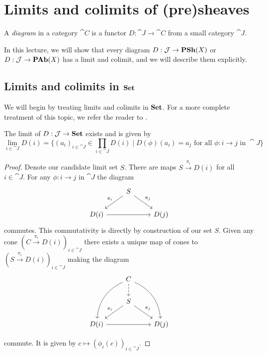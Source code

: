 \documentclass[../main.tex]{subfiles}
\begin{document}
\chapter{Limits and colimits of (pre)sheaves}
\begin{defn}
    A \emph{diagram} in a category $\cat C$ is a functor $D: \cat J \to \cat C$ from a small category $\cat J$. 
\end{defn}

In this lecture, we will show that every diagram $D: \mathcal{J} \to \operatorname{\mathbf{PSh}}(X)$ or $D: \mathcal{J} \to \operatorname{\mathbf{PAb}}(X)$ has a limit and colimit, and we will describe them explicitly.

\section{Limits and colimits in $\mathbf{Set}$}

We will begin by treating limits and colimits in $\mathbf{Set}$. For a more complete treatment of this topic, we refer the reader to \cite[Chapter~3.2]{riehlCategoryTheoryContext2016}.
\begin{prop}
    The limit of $D: \mathcal{J} \to \mathbf{Set}$ exists and is given by \[
        \lim_{i\in \cat J}D(i) = \{(a_i)_{i \in \cat J} \in \prod_{i \in \cat J}D(i) \mid D(\phi)(a_i) = a_j \text{ for all } \phi: i \to j \text{ in } \cat J\}
    \]
\end{prop}
\begin{proof}
	Denote our candidate limit set $S$. There are maps $S \xrightarrow{\pi_i} D(i)$ for all $i \in \cat J$. For any $\phi: i \to j$ in $\cat J$ the diagram 
    \[
      \begin{tikzcd}
                & S \arrow[ld, "\pi_i"'] \arrow[rd, "\pi_j"] &      \\
D(i) \arrow[rr] &                                            & D(j)
\end{tikzcd}  
    \]
commutes. This commutativity is directly by construction of our set $S$. Given any cone $(C \xrightarrow{\pi_i} D(i))_{i \in \cat J}$ there exists a unique map of cones to $(S \xrightarrow{\pi_i} D(i))_{i \in \cat J}$ making the diagram 
\[
\begin{tikzcd}
                & C \arrow[ldd, bend right] \arrow[rdd, bend left] \arrow[d, dashed] &      \\
                & S \arrow[ld, "\pi_i"'] \arrow[rd, "\pi_j"]                         &      \\
D(i) \arrow[rr] &                                                                    & D(j)
\end{tikzcd}\]

commute. It is given by $c \mapsto (\phi_i(c))_{i \in \cat J}$.

\end{proof}
\end{document}
